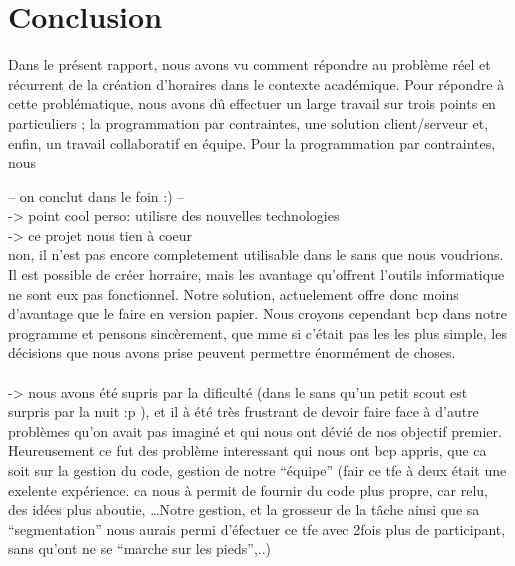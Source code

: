 \chapter*{Conclusion}

Dans le présent rapport, nous avons vu comment répondre au problème réel et récurrent de la création d'horaires dans le contexte académique. Pour répondre à cette problématique, nous avons dû effectuer un large travail sur trois points en particuliers ; la programmation par contraintes, une solution client/serveur et, enfin, un travail collaboratif en équipe.
\newline
\indent
Pour la programmation par contraintes, nous 

-- on conclut dans le foin :) --\\

->  point cool perso: utilisre des nouvelles technologies \\

->  ce projet nous tien à coeur \\
non, il n'est pas encore completement utilisable dans le sans que nous voudrions.
Il est possible de créer horraire, mais les avantage qu'offrent l'outils informatique ne sont eux pas fonctionnel. Notre solution, actuelement offre donc moins d'avantage que le faire en version papier.  Nous croyons cependant bcp dans notre programme et pensons sincèrement, que mme si c'était pas les les plus simple, les décisions que nous avons prise peuvent permettre énormément de choses.  \\\\

-> nous avons été supris par la dificulté (dans le sans qu'un petit scout est
surpris par la nuit :p ), et il à été très frustrant de devoir faire face à
d'autre problèmes qu'on avait pas imaginé et qui nous ont dévié de nos objectif
premier.  Heureusement ce fut des problème interessant qui nous ont bcp appris,
que ca soit sur la gestion du code, gestion de notre ``équipe'' (fair ce tfe à
deux était une exelente expérience. ca nous à permit de fournir du code plus
propre, car relu, des idées plus aboutie, \ldots Notre gestion, et la grosseur
de la tâche ainsi que sa ``segmentation'' nous aurais permi d'éfectuer ce tfe
avec 2fois plus de participant, sans qu'ont ne se ``marche sur les pieds'',..)
